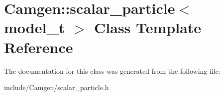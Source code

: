 \hypertarget{a00498}{}\section{Camgen\+:\+:scalar\+\_\+particle$<$ model\+\_\+t $>$ Class Template Reference}
\label{a00498}


The documentation for this class was generated from the following file\+:\begin{DoxyCompactItemize}
\item 
include/\+Camgen/scalar\+\_\+particle.\+h\end{DoxyCompactItemize}
